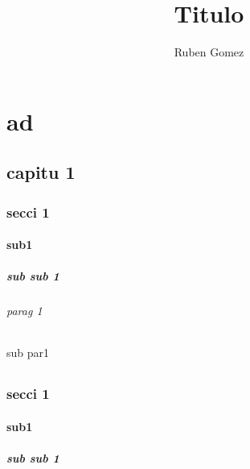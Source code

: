 \documentclass[12pt,a4paper,openany]{book}
\author{Ruben Gomez}
\title{Titulo}
\begin{document}
	\maketitle
	
	\tableofcontents
	
	\part{ad}
	
	\chapter{capitu 1}
	\Blindtext[3]


	\Blindtext[3]
	\section{secci 1}
	\Blindtext[3]
	\subsection{sub1}
	\Blindtext[3]
	\subsubsection{sub sub 1}
	\Blindtext[3]
	\paragraph{parag 1}
	\Blindtext[3]
	\subparagraph{sub par1}
	\Blindtext[3]

	
	
	
	
	
	
	\chapter{}
	\Blindtext[3]
	\section{secci 1}
	\Blindtext[3]
	\subsection{sub1}
	\Blindtext[3]
	\subsubsection{sub sub 1}
\end{document}
